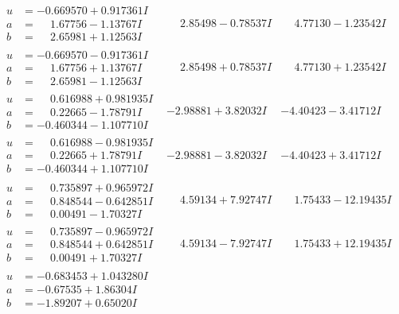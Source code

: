 \documentclass[1p]{elsarticle_modified}
\theoremstyle{definition}
\begin{document}
$$\begin{array}{c|c|c}
\begin{aligned}
u &= -0.669570 + 0.917361 I \\
a &= \phantom{-}1.67756 - 1.13767 I \\
b &= \phantom{-}2.65981 + 1.12563 I\end{aligned}
 & \phantom{-}2.85498 - 0.78537 I & \phantom{-}4.77130 - 1.23542 I \\ \hline\begin{aligned}
u &= -0.669570 - 0.917361 I \\
a &= \phantom{-}1.67756 + 1.13767 I \\
b &= \phantom{-}2.65981 - 1.12563 I\end{aligned}
 & \phantom{-}2.85498 + 0.78537 I & \phantom{-}4.77130 + 1.23542 I \\ \hline\begin{aligned}
u &= \phantom{-}0.616988 + 0.981935 I \\
a &= \phantom{-}0.22665 - 1.78791 I \\
b &= -0.460344 - 1.107710 I\end{aligned}
 & -2.98881 + 3.82032 I & -4.40423 - 3.41712 I \\ \hline\begin{aligned}
u &= \phantom{-}0.616988 - 0.981935 I \\
a &= \phantom{-}0.22665 + 1.78791 I \\
b &= -0.460344 + 1.107710 I\end{aligned}
 & -2.98881 - 3.82032 I & -4.40423 + 3.41712 I \\ \hline\begin{aligned}
u &= \phantom{-}0.735897 + 0.965972 I \\
a &= \phantom{-}0.848544 - 0.642851 I \\
b &= \phantom{-}0.00491 - 1.70327 I\end{aligned}
 & \phantom{-}4.59134 + 7.92747 I & \phantom{-}1.75433 - 12.19435 I \\ \hline\begin{aligned}
u &= \phantom{-}0.735897 - 0.965972 I \\
a &= \phantom{-}0.848544 + 0.642851 I \\
b &= \phantom{-}0.00491 + 1.70327 I\end{aligned}
 & \phantom{-}4.59134 - 7.92747 I & \phantom{-}1.75433 + 12.19435 I \\ \hline\begin{aligned}
u &= -0.683453 + 1.043280 I \\
a &= -0.67535 + 1.86304 I \\
b &= -1.89207 + 0.65020 I\end{aligned}

\end{array}$$
\end{document}
